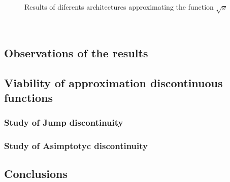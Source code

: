 \documentclass[a4paper, 11pt]{article}
\begin{document}
\begin{figure}[h]
    \hspace{1em}
    \caption{Results of diferents architectures approximating the function $\sqrt{x}$}
    \label{sqrt100}
\end{figure}\\

\newpage
\subsection{Observations of the results}
\subsection{Viability of approximation discontinuous functions}
\subsubsection{Study of Jump discontinuity}
\subsubsection{Study of Asimptotyc discontinuity}
\subsection{Conclusions}
\end{document}
